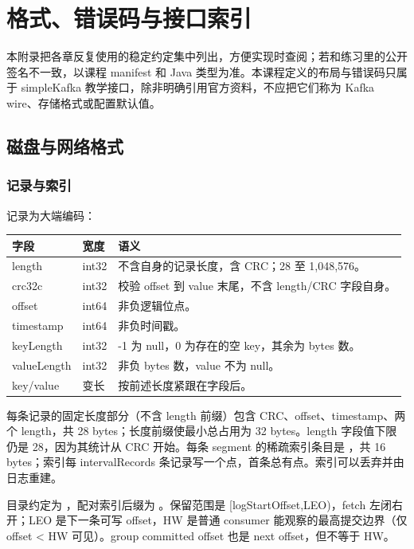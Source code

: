 \chapter{格式、错误码与接口索引}
本附录把各章反复使用的稳定约定集中列出，方便实现时查阅；若和练习里的公开签名不一致，以课程 manifest 和 Java 类型为准。本课程定义的布局与错误码只属于 simpleKafka 教学接口，除非明确引用官方资料，不应把它们称为 Kafka wire、存储格式或配置默认值。

\section{磁盘与网络格式}
\subsection{记录与索引}
记录为大端编码：
\begin{center}
\begin{tabular}{p{}p{}p{}}
\toprule
字段 & 宽度 & 语义 \\
\midrule
length & int32 & 不含自身的记录长度，含 CRC；28 至 1,048,576。\\
crc32c & int32 & 校验 offset 到 value 末尾，不含 length/CRC 字段自身。\\
offset & int64 & 非负逻辑位点。\\
timestamp & int64 & 非负时间戳。\\
keyLength & int32 & -1 为 null，0 为存在的空 key，其余为 bytes 数。\\
valueLength & int32 & 非负 bytes 数，value 不为 null。\\
key/value & 变长 & 按前述长度紧跟在字段后。\\
\bottomrule
\end{tabular}
\end{center}
每条记录的固定长度部分（不含 length 前缀）包含 CRC、offset、timestamp、两个 length，共 28 bytes；长度前缀使最小总占用为 32 bytes。length 字段值下限仍是 28，因为其统计从 CRC 开始。每条 segment 的稀疏索引条目是 ，共 16 bytes；索引每 intervalRecords 条记录写一个点，首条总有点。索引可以丢弃并由日志重建。

目录约定为 ，配对索引后缀为 。保留范围是 [logStartOffset,LEO)，fetch 左闭右开；LEO 是下一条可写 offset，HW 是普通 consumer 能观察的最高提交边界（仅 offset < HW 可见）。group committed offset 也是 next offset，但不等于 HW。

